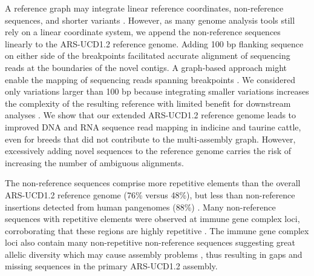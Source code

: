 \documentclass[../main.tex]{subfiles}
\begin{document}
A reference graph may integrate linear reference coordinates, non-reference sequences, and shorter variants \citep{hickey2020genotyping}. However, as many genome analysis tools still rely on a linear coordinate system, we append the non-reference sequences linearly to the ARS-UCD1.2 reference genome. Adding 100 bp flanking sequence on either side of the breakpoints facilitated accurate alignment of sequencing reads at the boundaries of the novel contigs. A graph-based approach might enable the mapping of sequencing reads spanning breakpoints \citep{hickey2020genotyping}. We considered only variations larger than 100 bp because integrating smaller variations increases the complexity of the resulting reference with limited benefit for downstream analyses \citep{li2020design}. We show that our extended ARS-UCD1.2 reference genome leads to improved DNA and RNA sequence read mapping in indicine and taurine cattle, even for breeds that did not contribute to the multi-assembly graph. However, excessively adding novel sequences to the reference genome carries the risk of increasing the number of ambiguous alignments.

The non-reference sequences comprise more repetitive elements than the overall ARS-UCD1.2 reference genome (76\% versus 48\%), but less than non-reference insertions detected from human pangenomes (88\%) \citep{sherman2019assembly,ameur2018novo}. Many non-reference sequences with repetitive elements were observed at immune gene complex loci, corroborating that these regions are highly repetitive \citep{schwartz2017evolution}. The immune gene complex loci also contain many non-repetitive non-reference sequences suggesting great allelic diversity which may cause assembly problems \citep{bakshy2021development}, thus resulting in gaps and missing sequences in the primary ARS-UCD1.2 assembly. 
\end{document}
